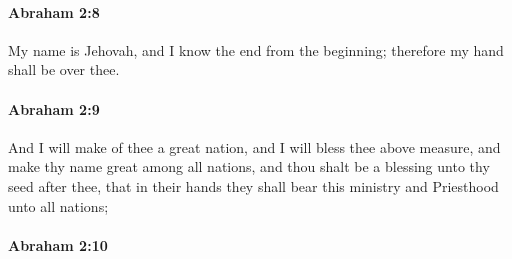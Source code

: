 		\paragraph{Abraham 2:8} %
			\label{ABRAHAM-2-8}

			My name is Jehovah, and I know the end from the beginning; therefore my hand shall be over thee.


		\paragraph{Abraham 2:9} %
			\label{ABRAHAM-2-9}

			And I will make of thee a great nation, and I will bless thee above measure, and make thy name great among all nations, and thou shalt be a blessing unto thy seed after thee, that in their hands they shall bear this ministry and Priesthood unto all nations;


		\paragraph{Abraham 2:10} %
			\label{ABRAHAM-2-10}

